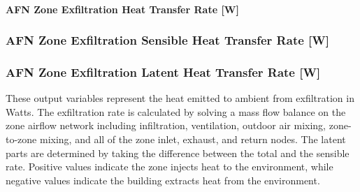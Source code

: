 \paragraph{AFN Zone Exfiltration Heat Transfer Rate {[}W{]}}\label{afn-zone-exfiltration-heat-transfer-rate-w}

\subsubsection{AFN Zone Exfiltration Sensible Heat Transfer Rate {[}W{]}}\label{afn-zone-exfiltration-sensible-heat-transfer-rate-w}

\subsubsection{AFN Zone Exfiltration Latent Heat Transfer Rate {[}W{]}}\label{afn-zone-exfiltration-latent-heat-transfer-rate-w}

These output variables represent the heat emitted to ambient from exfiltration in Watts. The exfiltration rate is calculated by solving a mass flow balance on the zone airflow network including infiltration, ventilation, outdoor air mixing, zone-to-zone mixing, and all of the zone inlet, exhaust, and return nodes. The latent parts are determined by taking the difference between the total and the sensible rate. Positive values indicate the zone injects heat to the environment, while negative values indicate the building extracts heat from the environment.
